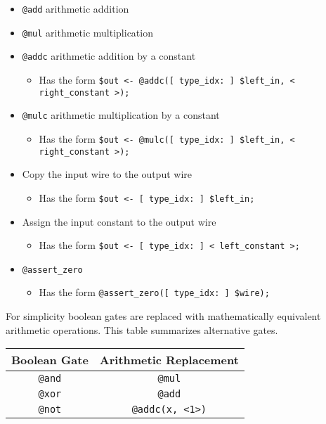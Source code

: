 \begin{itemize}
\item \texttt{@add} arithmetic addition
\item \texttt{@mul} arithmetic multiplication
\item \texttt{@addc} arithmetic addition by a constant
\begin{itemize}
    \item Has the form \texttt{\$out <- @addc([ type\_idx: ] \$left\_in, < right\_constant >);}
\end{itemize}
\item \texttt{@mulc} arithmetic multiplication by a constant
\begin{itemize}
    \item Has the form \texttt{\$out <- @mulc([ type\_idx: ] \$left\_in, < right\_constant >);}
\end{itemize}
\item Copy the input wire to the output wire
\begin{itemize}
    \item Has the form \texttt{\$out <- [ type\_idx: ] \$left\_in;}
\end{itemize}
\item Assign the input constant to the output wire
\begin{itemize}
    \item Has the form \texttt{\$out <- [ type\_idx: ] < left\_constant >;}
\end{itemize}
\item \texttt{@assert\_zero}
\begin{itemize}
    \item Has the form \texttt{@assert\_zero([ type\_idx: ] \$wire);}
\end{itemize}
\end{itemize}

For simplicity boolean gates are replaced with mathematically equivalent arithmetic operations.
This table summarizes alternative gates. \\

\noindent\begin{tabular}{|c|c|}
  \hline
  \textbf{Boolean Gate} & \textbf{Arithmetic Replacement} \\
  \hline
  \verb|@and| & \verb|@mul| \\
  \verb|@xor| & \verb|@add| \\
  \verb|@not| & \verb|@addc(x, <1>)| \\
  \hline
\end{tabular} \\

